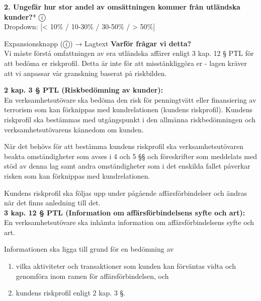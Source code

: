 \documentclass[10pt]{beamer}
\begin{document}
\begin{frame}[label=riskfragor-steg2]
  \vspace{0.2cm}

  \textbf{2. Ungefär hur stor andel av omsättningen kommer från utländska kunder?}* \hspace{0.3cm} ⓘ\\
  \tiny Dropdown: [< 10\% / 10-30\% / 30-50\% / > 50\%]
  \begin{alertblock}{Expansionsknapp (ⓘ) → Lagtext}
    \tiny \textbf{Varför frågar vi detta?}\\
    \tiny Vi måste förstå omfattningen av era utländska affärer enligt 3 kap. 12 § PTL för att bedöma 
    er riskprofil. Detta är inte för att misstänkliggöra er - lagen kräver att vi 
    anpassar vår granskning baserat på riskbilden.
    
    \vspace{0.1cm}
    \tiny \textbf{2 kap. 3 § PTL (Riskbedömning av kunder):}\\
    \tiny En verksamhetsutövare ska bedöma den risk för penningtvätt eller finansiering av terrorism 
    som kan förknippas med kundrelationen (kundens riskprofil). Kundens riskprofil ska bestämmas med 
    utgångspunkt i den allmänna riskbedömningen och verksamhetsutövarens kännedom om kunden.
    
    \tiny När det behövs för att bestämma kundens riskprofil ska verksamhetsutövaren beakta omständigheter 
    som avses i 4 och 5 §§ och föreskrifter som meddelats med stöd av denna lag samt andra omständigheter 
    som i det enskilda fallet påverkar risken som kan förknippas med kundrelationen.
    
    \tiny Kundens riskprofil ska följas upp under pågående affärsförbindelser och ändras när det finns 
    anledning till det.\\[0.1cm]
    
    \tiny \textbf{3 kap. 12 § PTL (Information om affärsförbindelsens syfte och art):}\\
    \tiny En verksamhetsutövare ska inhämta information om affärsförbindelsens syfte och art.
    
    \tiny Informationen ska ligga till grund för en bedömning av
    \begin{enumerate}
      \item vilka aktiviteter och transaktioner som kunden kan förväntas vidta och genomföra inom ramen 
      för affärsförbindelsen, och
      \item kundens riskprofil enligt 2 kap. 3 §.
    \end{enumerate}
    \vspace{0.1cm}
    

\end{alertblock}
\end{frame}
\end{document}

